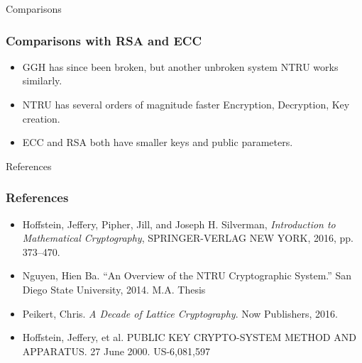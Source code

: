 \documentclass[12pt]{beamer}
\begin{document}
\begin{frame}{Comparisons}
    \frametitle{Comparisons with RSA and ECC}
    \begin{itemize}
        \item GGH has since been broken, but another unbroken system NTRU works similarly.
        \item NTRU has several orders of magnitude faster Encryption, Decryption, Key creation.
        \item ECC and RSA both have smaller keys and public parameters.
        
    \end{itemize}
    
\end{frame}

\begin{frame}{References}
    \frametitle{References}
    \begin{itemize}
        \item Hoffstein, Jeffery, Pipher, Jill, and Joseph H. Silverman, \textit{Introduction to Mathematical Cryptography}, SPRINGER-VERLAG NEW YORK, 2016, pp. 373–470.
        \item Nguyen, Hien Ba. “An Overview of the NTRU Cryptographic System.” San Diego State University, 2014. M.A. Thesis
        \item Peikert, Chris. \textit{A Decade of Lattice Cryptography}. Now Publishers, 2016.
        \item Hoffstein, Jeffery, et al. PUBLIC KEY CRYPTO-SYSTEM METHOD AND APPARATUS. 27 June 2000. US-6,081,597
    \end{itemize}
    
    
\end{frame}
\end{document}
